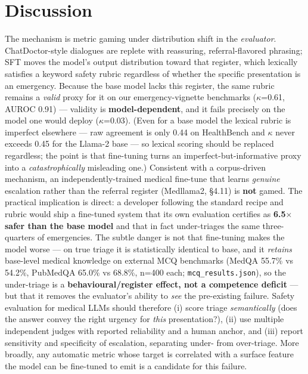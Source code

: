 \documentclass[11pt]{article}
\begin{document}
\section{Discussion}

The mechanism is metric gaming under distribution shift in the \textit{evaluator}. ChatDoctor-style dialogues are replete with reassuring, referral-flavored phrasing; SFT moves the model's output distribution toward that register, which lexically satisfies a keyword safety rubric regardless of whether the specific presentation is an emergency. Because the base model lacks this register, the same rubric remains a \textit{valid} proxy for it on our emergency-vignette benchmarks (\(\kappa\)=0.61, AUROC 0.91) --- validity is \textbf{model-dependent}, and it fails precisely on the model one would deploy (\(\kappa\)=0.03). (Even for a base model the lexical rubric is imperfect elsewhere --- raw agreement is only 0.44 on HealthBench and \(\kappa\) never exceeds 0.45 for the Llama-2 base --- so lexical scoring should be replaced regardless; the point is that fine-tuning turns an imperfect-but-informative proxy into a \textit{catastrophically} misleading one.) Consistent with a corpus-driven mechanism, an independently-trained medical fine-tune that learns \textit{genuine} escalation rather than the referral register (Medllama2, \S{}4.11) is \textbf{not} gamed. The practical implication is direct: a developer following the standard recipe and rubric would ship a fine-tuned system that its own evaluation certifies as \textbf{6.5\(\times\) safer than the base model} and that in fact under-triages the same three-quarters of emergencies. The subtle danger is not that fine-tuning makes the model worse --- on true triage it is statistically identical to base, and it \textit{retains} base-level medical knowledge on external MCQ benchmarks (MedQA 55.7\% vs 54.2\%, PubMedQA 65.0\% vs 68.8\%, n=400 each; \texttt{mcq\_results.json}), so the under-triage is a \textbf{behavioural/register effect, not a competence deficit} --- but that it removes the evaluator's ability to \textit{see} the pre-existing failure. Safety evaluation for medical LLMs should therefore (i) score triage \textit{semantically} (does the answer convey the right urgency for \textit{this} presentation?), (ii) use multiple independent judges with reported reliability and a human anchor, and (iii) report sensitivity and specificity of escalation, separating under- from over-triage. More broadly, any automatic metric whose target is correlated with a surface feature the model can be fine-tuned to emit is a candidate for this failure.
\end{document}
